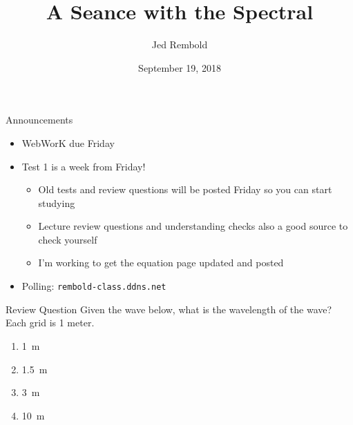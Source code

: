 \documentclass[pdf,xcolor={rgb},aspectratio=169]{beamer}
\title{A Seance with the Spectral}
\date{September 19, 2018}
\author{Jed Rembold}
\begin{document}
\renewcommand*{\theenumi}{\Alph{enumi}}

\begin{frame}{Announcements}
	\begin{itemize}
	  \item WebWorK due Friday
	  \item Test 1 is a week from Friday!
		\begin{itemize}
		  \item Old tests and review questions will be posted Friday so you can start studying
		  \item Lecture review questions and understanding checks also a good source to check yourself
		  \item I'm working to get the equation page updated and posted
		\end{itemize}
	\item Polling: \nolinkurl{rembold-class.ddns.net}
	\end{itemize}
\end{frame}

\begin{frame}{Review Question}
	Given the wave below, what is the wavelength of the wave? Each grid is 1 meter.
	\begin{enumerate}
		\item \SI{1}{\meter}
		\item \SI{1.5}{\meter}
		\item \alert<2>{\SI{3}{\meter}}
		\item \SI{10}{\meter}
	\end{enumerate}
	\begin{center}
	\end{center}
\end{frame}
\end{document}
